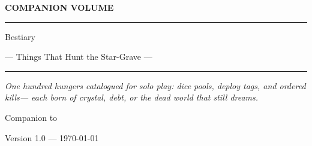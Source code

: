\begin{titlepage}
  \thispagestyle{empty}
  \centering
  \vspace*{1.8cm}

  {\GameSans\footnotesize\bfseries\color{ash} COMPANION VOLUME\par}
  \vspace{0.6cm}
  {\color{blood}\rule{0.55\textwidth}{0.6pt}\par}
  \vspace{0.8cm}

  \shardmark[2.4cm]

  \vspace{0.9cm}

  {\TitleFont\Huge\color{shardink} Bestiary \par}

  \vspace{0.45cm}
  {\TitleFont\large\color{blood} --- Things That Hunt the Star-Grave ---\par}

  \vspace{0.55cm}
  {\color{blood}\rule{0.55\textwidth}{0.6pt}\par}

  \vspace{1.4cm}

  \begin{minipage}{0.72\textwidth}
    \centering
    \itshape\color{shardink}
    One hundred hungers catalogued for solo play:
    dice pools, deploy tags, and ordered kills---
    each born of crystal, debt, or the dead world that still dreams.
  \end{minipage}

  \vfill

  {\GameSans\small\color{ash} Companion to \game{} \par}
  \vspace{0.35cm}
  {\GameSans\small\color{ash} Version 1.0 --- \today \par}
\end{titlepage}
